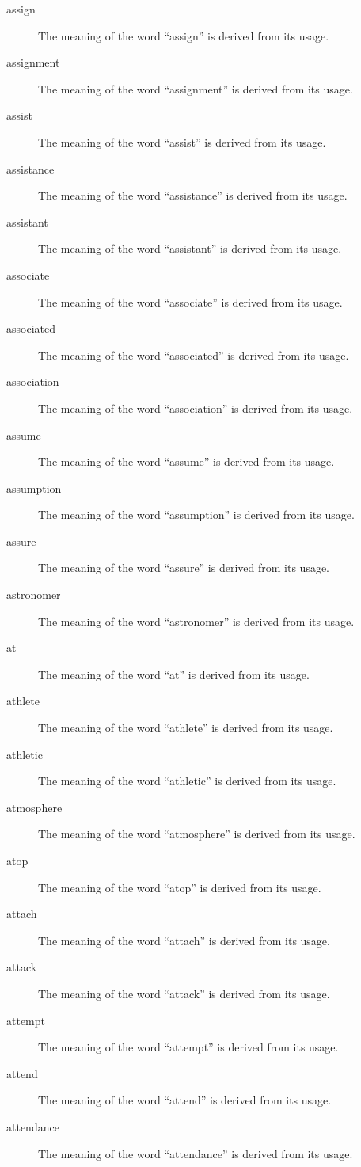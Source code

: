 \documentclass[12pt, letterpaper]{memoir}
\begin{document}
\begin{description}
\item[assign] The meaning of the word ``assign'' is derived from its usage.
\item[assignment] The meaning of the word ``assignment'' is derived from its usage.
\item[assist] The meaning of the word ``assist'' is derived from its usage.
\item[assistance] The meaning of the word ``assistance'' is derived from its usage.
\item[assistant] The meaning of the word ``assistant'' is derived from its usage.
\item[associate] The meaning of the word ``associate'' is derived from its usage.
\item[associated] The meaning of the word ``associated'' is derived from its usage.
\item[association] The meaning of the word ``association'' is derived from its usage.
\item[assume] The meaning of the word ``assume'' is derived from its usage.
\item[assumption] The meaning of the word ``assumption'' is derived from its usage.
\item[assure] The meaning of the word ``assure'' is derived from its usage.
\item[astronomer] The meaning of the word ``astronomer'' is derived from its usage.
\item[at] The meaning of the word ``at'' is derived from its usage.
\item[athlete] The meaning of the word ``athlete'' is derived from its usage.
\item[athletic] The meaning of the word ``athletic'' is derived from its usage.
\item[atmosphere] The meaning of the word ``atmosphere'' is derived from its usage.
\item[atop] The meaning of the word ``atop'' is derived from its usage.
\item[attach] The meaning of the word ``attach'' is derived from its usage.
\item[attack] The meaning of the word ``attack'' is derived from its usage.
\item[attempt] The meaning of the word ``attempt'' is derived from its usage.
\item[attend] The meaning of the word ``attend'' is derived from its usage.
\item[attendance] The meaning of the word ``attendance'' is derived from its usage.

\end{description}
\end{document}
